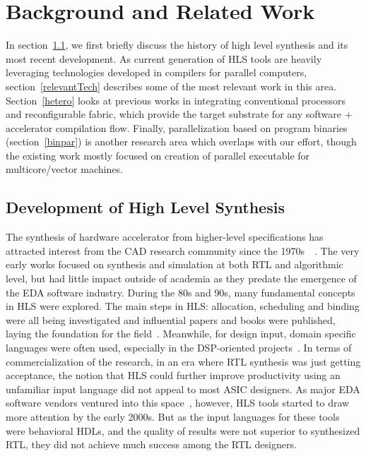 \chapter{Background and Related Work}
\label{relatedWorkChap}
In section~\ref{hlsDevel}, we first briefly discuss the history of high level synthesis 
and its most recent development. As current generation of HLS tools are heavily leveraging
technologies developed in compilers for parallel computers, section~\ref{relevantTech}
describes some of the most relevant work in this area. 
Section~\ref{hetero} looks at previous works in 
integrating conventional processors and reconfigurable fabric, which
provide the target substrate for any software + accelerator
compilation flow. Finally, parallelization based on program
binaries (section~\ref{binpar}) is another research area which overlaps with our effort, though the existing work mostly focused on creation
of parallel executable for multicore/vector machines.


\section{Development of High Level Synthesis}
\label{hlsDevel}
The synthesis of hardware accelerator from higher-level specifications 
has attracted interest from the CAD research community since the 1970s~\cite{Barbacci:1973:AED:906664}~\cite{Parker:1979:CDA:800292.811694}.
The very early works focused on synthesis and simulation at both RTL and algorithmic level, but had little impact outside of academia as 
they predate the emergence of the EDA software industry. During the 80s and 90s, many fundamental concepts in HLS were explored. The main steps in HLS: allocation, scheduling and binding were all being investigated and influential papers and books were published, laying the foundation for the field~\cite{Paulin:1987:FSA:37888.37918}\cite{Park:1986:SPS:318013.318086}\cite{Camposano:1991:HVS:574732}\cite{1586344}\cite{31534}\cite{1270207}\cite{75629}\cite{390403}\cite{Karfa:2006:FVM:1126255.1126731}. Meanwhile, for design input, domain specific languages were often used, especially in the DSP-oriented 
projects~\cite{116097}\cite{20869}\cite{Chu89hyper:an}. In terms of commercialization of the research, in an era where RTL synthesis
was just getting acceptance, the notion that HLS could further improve productivity using an unfamiliar input language did not appeal
to most ASIC designers. As major EDA software vendors ventured into this space~\cite{Knapp:1996:BSD:236240}\cite{tools:monet}, however, HLS tools started 
to draw more attention by the early 2000s. But as the input languages for these tools were behavioral HDLs, 
and the quality of results were not superior to synthesized RTL, they did not achieve much success among the RTL designers. 

